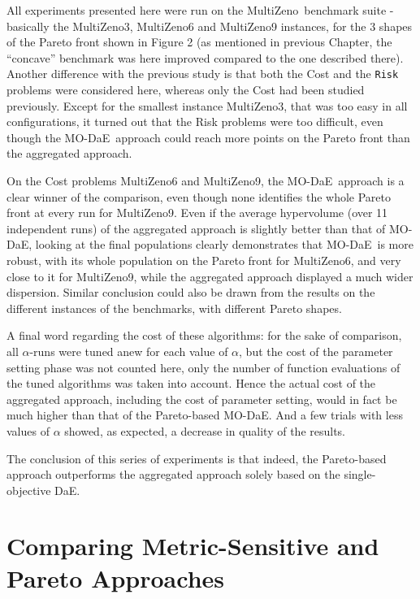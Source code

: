 \documentclass[english]{DESCARWINreport}
\newcounter{hyp}
\newcounter{con}
\def\DAE{{\sc DaE}}
\def\MODAE{{\sc MO-DaE}}
\def\MULTIZENO{{\sc MultiZeno}}
\begin{document}
All experiments presented here were run on the \MULTIZENO\ benchmark suite - basically the \MULTIZENO3, \MULTIZENO6 and \MULTIZENO9 instances, for the 3 shapes of the Pareto front shown in Figure 2 (as mentioned in previous Chapter, the ``concave'' benchmark was here improved compared to the one described there). Another difference with the previous study is that both the {\sc Cost} and the {\tt Risk} problems were considered here, whereas only the {\sc Cost} had been studied previously. Except for the smallest instance \MULTIZENO3, that was too easy in all configurations, it turned out that the {\sc Risk} problems were too difficult, even though the \MODAE\ approach could reach more points on the Pareto front than the aggregated approach.

On the {\sc Cost} problems \MULTIZENO6 and \MULTIZENO9, the \MODAE\ approach is a clear winner of the comparison, even though none identifies the whole Pareto front at every run for \MULTIZENO9. Even if the average hypervolume (over 11 independent runs) of the aggregated approach is slightly better than that of \MODAE, looking at the final populations clearly demonstrates that \MODAE\ is more robust, with its whole population on the Pareto front for \MULTIZENO6, and very close to it for \MULTIZENO9, while the aggregated approach displayed a much wider dispersion. 
Similar conclusion could also be drawn from the results on the different instances of the benchmarks, with different Pareto shapes. 

A final word regarding the cost of these algorithms: for the sake of comparison, all $\alpha$-runs were tuned anew for each value of $\alpha$, but the cost of the parameter setting phase was not counted here, only the number of function evaluations of the tuned algorithms was taken into account. Hence the actual cost of the aggregated approach, including the cost of parameter setting, would in fact be much higher than that of the Pareto-based \MODAE. And a few trials with less values of $\alpha$ showed, as expected, a decrease in quality of the results.

The conclusion of this series of experiments is that indeed, the Pareto-based approach outperforms the aggregated approach solely based on the single-objective \DAE.

\newpage
\hoffset 0cm

\newpage
\hoffset -2cm

\chapter{Comparing Metric-Sensitive and Pareto Approaches}
\end{document}
